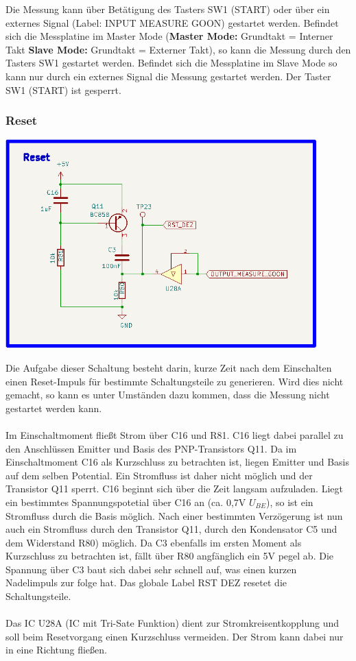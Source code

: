 Die Messung kann über Betätigung des Tasters SW1 (START) oder über ein externes Signal (Label: INPUT MEASURE GOON) gestartet werden. Befindet sich die Messplatine im \glqq Master Mode \grqq{} (\textbf{Master Mode:}  Grundtakt = Interner Takt \textbf{Slave Mode:} Grundtakt = Externer Takt), so kann die Messung durch den Tasters SW1 gestartet werden. Befindet sich die Messplatine im \glqq Slave Mode \grqq{} so kann nur durch ein externes Signal die Messung gestartet werden. Der Taster SW1 (START) ist gesperrt.

\newpage
\subsubsection{Reset}

\begin{center}
\includegraphics[width=12cm]{Bilder/Reset.png}
\end{center}

Die Aufgabe dieser Schaltung besteht darin, kurze Zeit nach dem Einschalten einen Reset-Impuls für bestimmte Schaltungsteile zu generieren. Wird dies nicht gemacht, so kann es unter Umständen dazu kommen, dass die Messung nicht gestartet werden kann.
\\
\\
Im Einschaltmoment fließt Strom über C16 und R81. C16 liegt dabei parallel zu den Anschlüssen \glqq Emitter und Basis\grqq{} des PNP-Transistors Q11. Da im Einschaltmoment C16 als Kurzschluss zu betrachten ist, liegen Emitter und Basis auf dem selben Potential. Ein Stromfluss ist daher nicht möglich und der Transistor Q11 sperrt. C16 beginnt sich über die Zeit langsam aufzuladen. Liegt ein bestimmtes Spannungspotetial über C16 an (ca. 0,7V $U_{BE}$), so ist ein Stromfluss durch die Basis möglich. Nach einer bestimmten Verzögerung ist nun auch ein Stromfluss durch den Transistor Q11, durch den Kondensator C5 und dem Widerstand R80) möglich. Da C3 ebenfalls im ersten Moment als Kurzschluss zu betrachten ist, fällt über R80 angfänglich ein 5V pegel ab. Die Spannung über C3 baut sich dabei sehr schnell auf, was einen kurzen Nadelimpuls zur folge hat. Das globale Label \glqq RST DEZ\grqq{} resetet die Schaltungsteile.  
\\
\\
Das IC U28A (IC mit Tri-Sate Funktion) dient zur Stromkreisentkopplung und soll beim Resetvorgang einen Kurzschluss vermeiden. Der Strom kann dabei nur in eine Richtung fließen.

